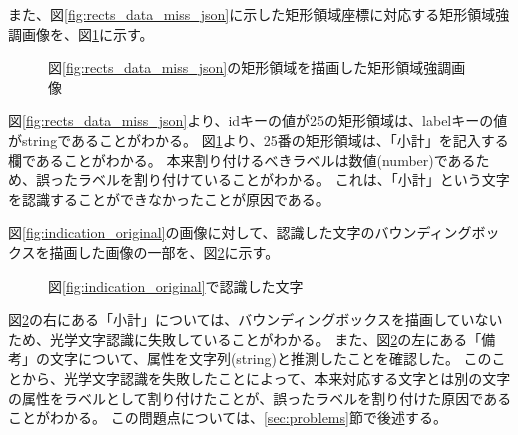 また、図\ref{fig:rects_data_miss_json}に示した矩形領域座標に対応する矩形領域強調画像を、図\ref{fig:highlighted_rects_miss_part}に示す。

\begin{figure}[tp]
    \begin{center}
        \caption{図\ref{fig:rects_data_miss_json}の矩形領域を描画した矩形領域強調画像}
        \label{fig:highlighted_rects_miss_part}
    \end{center}
\end{figure}

図\ref{fig:rects_data_miss_json}より、idキーの値が25の矩形領域は、labelキーの値がstringであることがわかる。
図\ref{fig:highlighted_rects_miss_part}より、25番の矩形領域は、「小計」を記入する欄であることがわかる。
本来割り付けるべきラベルは数値(number)であるため、誤ったラベルを割り付けていることがわかる。
これは、「小計」という文字を認識することができなかったことが原因である。

図\ref{fig:indication_original}の画像に対して、認識した文字のバウンディングボックスを描画した画像の一部を、図\ref{fig:OCR_result}に示す。

\begin{figure}[tp]
    \begin{center}
        \caption{図\ref{fig:indication_original}で認識した文字}
        \label{fig:OCR_result}
    \end{center}
\end{figure}

図\ref{fig:OCR_result}の右にある「小計」については、バウンディングボックスを描画していないため、光学文字認識に失敗していることがわかる。
また、図\ref{fig:OCR_result}の左にある「備考」の文字について、属性を文字列(string)と推測したことを確認した。
このことから、光学文字認識を失敗したことによって、本来対応する文字とは別の文字の属性をラベルとして割り付けたことが、誤ったラベルを割り付けた原因であることがわかる。
この問題点については、\ref{sec:problems}節で後述する。

